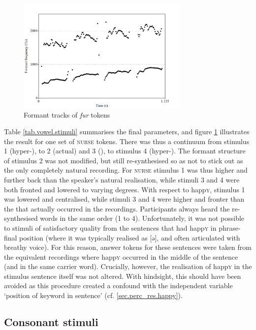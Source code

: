 \begin{figure}[h]
	\centering
	\includegraphics[width=0.75\textwidth]{./figures/fur_spectrogram.png}
	\caption{Formant tracks of \emph{fur} tokens}
	\label{fig.fur.spec}
\end{figure}

Table \ref{tab.vowel.stimuli} summarises the final parameters, and figure \ref{fig.fur.spec} illustrates the result for one set of \textsc{nurse} tokens.
There was thus a continuum from stimulus 1 (hyper-), to 2 (actual) and 3 (), to stimulus 4 (hyper-).
The formant structure of stimulus 2 was not modified, but still re-synthesised so as not to stick out as the only completely natural recording.
For \textsc{nurse} stimulus 1 was thus higher and further back than the speaker's natural realisation, while stimuli 3 and 4 were both fronted and lowered to varying degrees.
With respect to happ\textsc{y}, stimulus 1 was lowered and centralised, while stimuli 3 and 4 were higher and fronter than the  that actually occurred in the recordings.
Participants always heard the re-synthesised words in the same order (1 to 4).
Unfortunately, it was not possible to  stimuli of satisfactory quality from the sentences that had happ\textsc{y} in phrase-final position (where it was typically realised as [ə], and often articulated with breathy voice).
For this reason, answer tokens for these sentences were taken from the equivalent recordings where happ\textsc{y} occurred in the middle of the sentence (and in the same carrier word).
Crucially, however, the realisation of happ\textsc{y} in the stimulus sentence itself was not altered.
With hindsight, this should have been avoided as this procedure created a confound with the independent variable `position of keyword in sentence' (cf. \ref{sec.perc_res.happy}).

\subsection{Consonant stimuli}\label{sec.perc_method.con}

